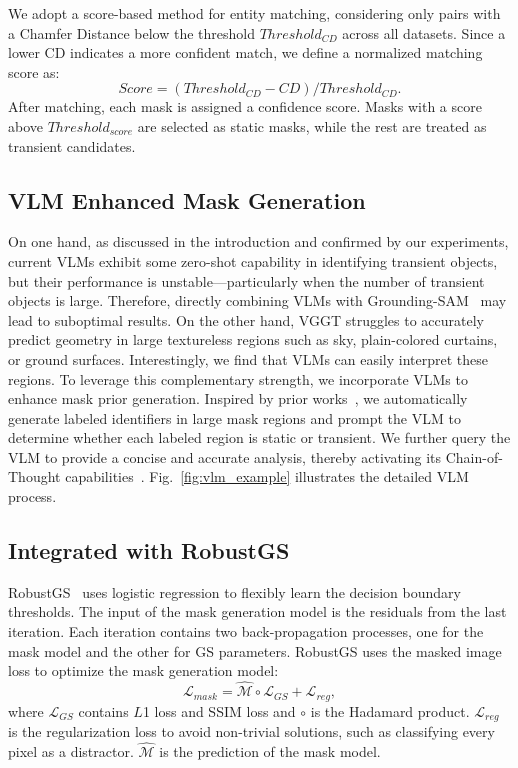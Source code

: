 \documentclass[letterpaper, 10 pt, conference]{ieeeconf}  %
\begin{document}
We adopt a score-based method for entity matching, considering only pairs with a Chamfer Distance below the threshold $Threshold_{CD}$ across all datasets. Since a lower CD indicates a more confident match, we define a normalized matching score as:
\begin{equation}
    Score = (Threshold_{CD}-CD) / Threshold_{CD}.
\end{equation}
After matching, each mask is assigned a confidence score. Masks with a score above $Threshold_{score}$ are selected as static masks, while the rest are treated as transient candidates.

\subsection{VLM Enhanced Mask Generation}
\label{VLM}
On one hand, as discussed in the introduction and confirmed by our experiments, current VLMs exhibit some zero-shot capability in identifying transient objects, but their performance is unstable—particularly when the number of transient objects is large. Therefore, directly combining VLMs with Grounding-SAM~\cite{ren2024grounded} may lead to suboptimal results. On the other hand, VGGT struggles to accurately predict geometry in large textureless regions such as sky, plain-colored curtains, or ground surfaces. Interestingly, we find that VLMs can easily interpret these regions. To leverage this complementary strength, we incorporate VLMs to enhance mask prior generation. Inspired by prior works~\cite{guo2024regiongpt}, we automatically generate labeled identifiers in large mask regions and prompt the VLM to determine whether each labeled region is static or transient. We further query the VLM to provide a concise and accurate analysis, thereby activating its Chain-of-Thought capabilities~\cite{wei2022chain, wu2025grounded}. Fig.~\ref{fig:vlm_example} illustrates the detailed VLM process.




\subsection{Integrated with RobustGS}
\label{Integrate}
RobustGS~\cite{ungermann2024robust} uses logistic regression to flexibly learn the decision boundary thresholds. The input of the mask generation model is the residuals from the last iteration. Each iteration contains two back-propagation processes, one for the mask model and the other for GS parameters. RobustGS uses the masked image loss to optimize the mask generation model:
\begin{equation}
    \mathcal{L}_{mask} = \hat{\mathcal{M}} \circ \mathcal{L}_{GS} + \mathcal{L}_{reg},
\end{equation}
where $\mathcal{L}_{GS}$ contains $L$1 loss and SSIM loss and $\circ$ is the Hadamard product. $\mathcal{L}_{reg}$ is the regularization loss to avoid non-trivial solutions, such as classifying every pixel as a distractor. $\hat{\mathcal{M}}$ is the prediction of the mask model.
\end{document}
